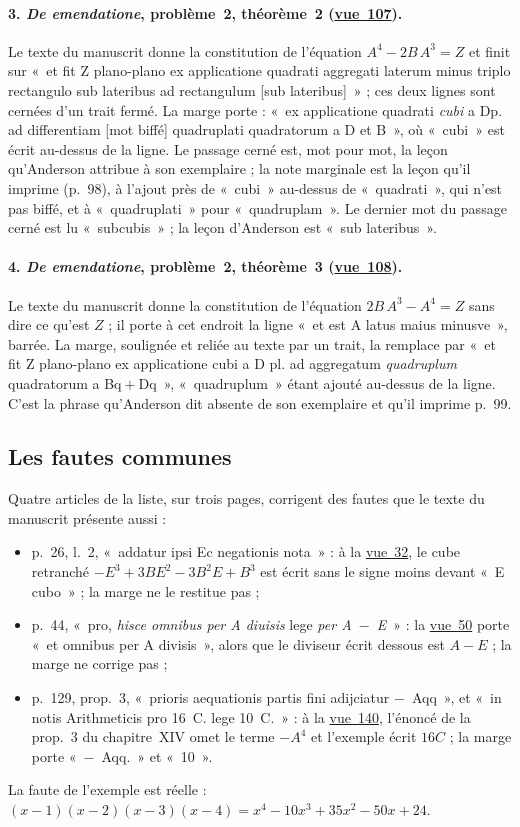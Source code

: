 \documentclass[11pt,a4paper]{article}
\theoremstyle{remark}
\newcommand{\vue}[1]{\href{https://gallica.bnf.fr/ark:/12148/btv1b10033620q/f#1.item}{vue~#1}}
\begin{document}
\paragraph{3. \emph{De emendatione}, problème~2, théorème~2 (\vue{107}).}
Le texte du manuscrit donne la constitution de l'équation
$A^4 - 2B\,A^3 = Z$ et finit sur «~et fit Z plano-plano ex applicatione
quadrati aggregati laterum minus triplo rectangulo sub lateribus ad
rectangulum [sub lateribus]~» ; ces deux lignes sont cernées d'un trait
fermé. La marge porte : «~ex applicatione quadrati \emph{cubi} a Dp. ad
differentiam [mot biffé] quadruplati quadratorum a D et B~», où «~cubi~»
est écrit au-dessus de la ligne. Le passage cerné est, mot pour mot, la
leçon qu'Anderson attribue à son exemplaire ; la note marginale est la leçon
qu'il imprime (p.~98), à l'ajout près de «~cubi~» au-dessus de
«~quadrati~», qui n'est pas biffé, et à «~quadruplati~» pour
«~quadruplam~». Le dernier mot du passage cerné est lu «~subcubis~» ; la
leçon d'Anderson est «~sub lateribus~».

\paragraph{4. \emph{De emendatione}, problème~2, théorème~3 (\vue{108}).}
Le texte du manuscrit donne la constitution de l'équation
$2B\,A^3 - A^4 = Z$ sans dire ce qu'est $Z$ ; il porte à cet endroit la
ligne «~et est A latus maius minusve~», barrée. La marge, soulignée et
reliée au texte par un trait, la remplace par «~et fit Z plano-plano ex
applicatione cubi a D pl. ad aggregatum \emph{quadruplum} quadratorum a
Bq${}+{}$Dq~», «~quadruplum~» étant ajouté au-dessus de la ligne. C'est la
phrase qu'Anderson dit absente de son exemplaire et qu'il imprime p.~99.

\subsection{Les fautes communes}

Quatre articles de la liste, sur trois pages, corrigent des fautes que le
texte du manuscrit présente aussi :
\begin{itemize}
\item p.~26, l.~2, «~addatur ipsi Ec negationis nota~» : à la \vue{32}, le
cube retranché $-E^3 + 3BE^2 - 3B^2E + B^3$ est écrit sans le signe moins
devant «~E cubo~» ; la marge ne le restitue pas ;
\item p.~44, «~pro, \emph{hisce omnibus per A diuisis} lege \emph{per
A~$-$~E}~» : la \vue{50} porte «~et omnibus per A divisis~», alors que le
diviseur écrit dessous est $A - E$ ; la marge ne corrige pas ;
\item p.~129, prop.~3, «~prioris aequationis partis fini adijciatur
$-$~Aqq~», et «~in notis Arithmeticis pro 16~C. lege 10~C.~» : à la
\vue{140}, l'énoncé de la prop.~3 du chapitre~XIV omet le terme $-A^4$ et
l'exemple écrit $16C$ ; la marge porte «~$-$~Aqq.~» et «~10~».
\end{itemize}
La faute de l'exemple est réelle :
$(x-1)(x-2)(x-3)(x-4) = x^4 - 10x^3 + 35x^2 - 50x + 24$.
\end{document}

